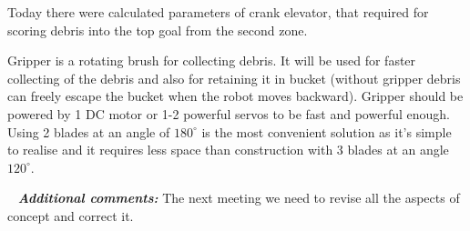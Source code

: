 \begin{enumerate*}
  	\item Today there were calculated parameters of crank elevator, that required for scoring debris into the top goal from the second zone.
  	\begin{figure}[H]
  		\begin{minipage}[h]{1\linewidth}
  		  \caption{}
  		\end{minipage}
  	\end{figure}
  	
  	\item Gripper is a rotating brush for collecting debris. It will be used for faster collecting of the debris and also for retaining it in bucket (without gripper debris can freely escape the bucket when the robot moves backward). Gripper should be powered by 1 DC motor or 1-2 powerful servos to be fast and powerful enough. Using 2 blades at an angle of $180^\circ$ is the most convenient solution as it's simple to realise and it requires less space than construction with 3 blades at an angle $120^\circ$.
  	\begin{figure}[H]
  		\begin{minipage}[h]{1\linewidth}
	  	  \caption{}
  		\end{minipage}
  	\end{figure}
  	
  \end{enumerate*}
  
   \newline
  \textit{\textbf{Additional comments:}} The next meeting we need to revise all the aspects of concept and correct it.
  
\fillpage
